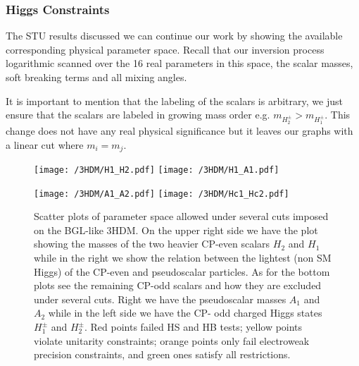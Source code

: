 \documentclass[10pt]{book}
\renewcommand{\(}{\left(}
\renewcommand{\)}{\right)}
\renewcommand{\[}{\left[}
\renewcommand{\]}{\right]}
\begin{document}

\subsubsection{Higgs Constraints}

The STU results discussed we can continue our work by showing the available corresponding physical parameter space. 
%
Recall that our inversion process logarithmic scanned over the 16 real parameters in this space, the scalar masses, soft breaking terms and all mixing angles.  
%
%

It is important to mention that the labeling of the scalars is arbitrary, we just ensure that the scalars are labeled in growing mass order e.g. $m_{H^\pm_2} > m_{H^\pm_1}$. 
%
This change does not have any real physical significance but it leaves our graphs with a linear cut where $m_i = m_j$. 
%
\begin{figure}[H]
	\centering
	\texttt{[image: /3HDM/H1\_H2.pdf]}
	\texttt{[image: /3HDM/H1\_A1.pdf]}
\end{figure}	
\begin{figure}[H]\ContinuedFloat
    \centering
	\texttt{[image: /3HDM/A1\_A2.pdf]}
	\texttt{[image: /3HDM/Hc1\_Hc2.pdf]}
	\caption{Scatter plots of parameter space allowed under several cuts imposed on the BGL-like 3HDM. On the upper right side we have the plot showing the masses of the two heavier CP-even scalars $H_2$ and $H_1$ while in the right we show the relation between the lightest (non SM Higgs) of the CP-even and pseudoscalar particles. As for the bottom plots see the remaining CP-odd scalars and how they are excluded under several cuts. Right we have the pseudoscalar masses $A_1$ and $A_2$ while in the left side we have the CP- odd charged Higgs states $H_1^\pm$ and $H_2^\pm$.	Red points failed HS and HB tests; yellow points violate unitarity constraints; orange points only fail electroweak precision constraints, and green ones satisfy all restrictions.}
	\label{fig:H1_A1_Plots}
\end{figure}	
\end{document}

